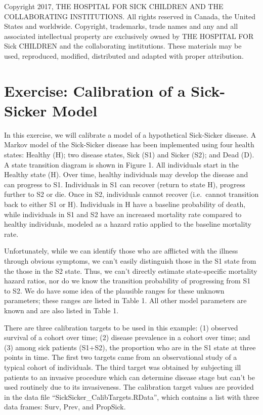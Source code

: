 \documentclass[
]{article}
\begin{document}
Copyright 2017, THE HOSPITAL FOR SICK CHILDREN AND THE COLLABORATING
INSTITUTIONS. All rights reserved in Canada, the United States and
worldwide. Copyright, trademarks, trade names and any and all associated
intellectual property are exclusively owned by THE HOSPITAL FOR Sick
CHILDREN and the collaborating institutions. These materials may be
used, reproduced, modified, distributed and adapted with proper
attribution.

\hypertarget{exercise-calibration-of-a-sick-sicker-model}{%
\section{Exercise: Calibration of a Sick-Sicker
Model}\label{exercise-calibration-of-a-sick-sicker-model}}

In this exercise, we will calibrate a model of a hypothetical
Sick-Sicker disease. A Markov model of the Sick-Sicker disease has been
implemented using four health states: Healthy (H); two disease states,
Sick (S1) and Sicker (S2); and Dead (D). A state transition diagram is
shown in Figure 1. All individuals start in the Healthy state (H). Over
time, healthy individuals may develop the disease and can progress to
S1. Individuals in S1 can recover (return to state H), progress further
to S2 or die. Once in S2, individuals cannot recover (i.e.~cannot
transition back to either S1 or H). Individuals in H have a baseline
probability of death, while individuals in S1 and S2 have an increased
mortality rate compared to healthy individuals, modeled as a hazard
ratio applied to the baseline mortality rate.

Unfortunately, while we can identify those who are afflicted with the
illness through obvious symptoms, we can't easily distinguish those in
the S1 state from the those in the S2 state. Thus, we can't directly
estimate state-specific mortality hazard ratios, nor do we know the
transition probability of progressing from S1 to S2. We do have some
idea of the plausible ranges for these unknown parameters; these ranges
are listed in Table 1. All other model parameters are known and are also
listed in Table 1.

There are three calibration targets to be used in this example: (1)
observed survival of a cohort over time; (2) disease prevalence in a
cohort over time; and (3) among sick patients (S1+S2), the proportion
who are in the S1 state at three points in time. The first two targets
came from an observational study of a typical cohort of individuals. The
third target was obtained by subjecting ill patients to an invasive
procedure which can determine disease stage but can't be used routinely
due to its invasiveness. The calibration target values are provided in
the data file ``SickSicker\_CalibTargets.RData'', which contains a list
with three data frames: Surv, Prev, and PropSick.
\end{document}
